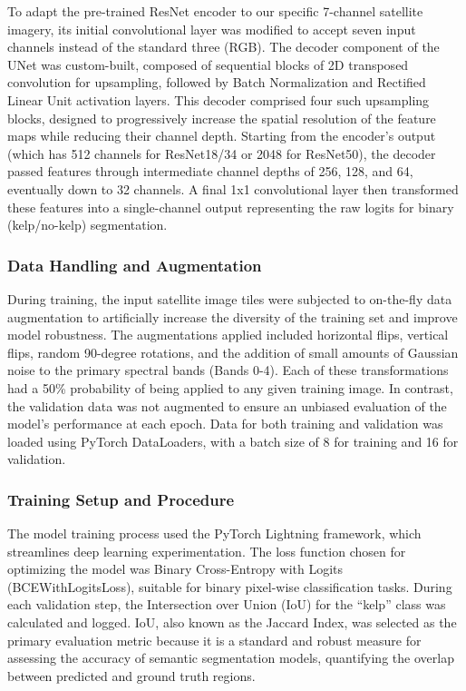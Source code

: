 \documentclass{article}
\begin{document}
To adapt the pre-trained ResNet encoder to our specific 7-channel satellite imagery, its initial convolutional layer was modified to accept seven input channels instead of the standard three (RGB). The decoder component of the UNet was custom-built, composed of sequential blocks of 2D transposed convolution for upsampling, followed by Batch Normalization and Rectified Linear Unit activation layers. This decoder comprised four such upsampling blocks, designed to progressively increase the spatial resolution of the feature maps while reducing their channel depth. Starting from the encoder's output (which has 512 channels for ResNet18/34 or 2048 for ResNet50), the decoder passed features through intermediate channel depths of 256, 128, and 64, eventually down to 32 channels. A final 1x1 convolutional layer then transformed these features into a single-channel output representing the raw logits for binary (kelp/no-kelp) segmentation.

\subsubsection{Data Handling and Augmentation}

During training, the input satellite image tiles were subjected to on-the-fly data augmentation to artificially increase the diversity of the training set and improve model robustness. The augmentations applied included horizontal flips, vertical flips, random 90-degree rotations, and the addition of small amounts of Gaussian noise to the primary spectral bands (Bands 0-4). Each of these transformations had a 50\% probability of being applied to any given training image. In contrast, the validation data was not augmented to ensure an unbiased evaluation of the model's performance at each epoch. Data for both training and validation was loaded using PyTorch DataLoaders, with a batch size of 8 for training and 16 for validation.

\subsubsection{Training Setup and Procedure}

The model training process used the PyTorch Lightning framework, which streamlines deep learning experimentation. The loss function chosen for optimizing the model was Binary Cross-Entropy with Logits (BCEWithLogitsLoss), suitable for binary pixel-wise classification tasks. During each validation step, the Intersection over Union (IoU) for the ``kelp'' class was calculated and logged. IoU, also known as the Jaccard Index, was selected as the primary evaluation metric because it is a standard and robust measure for assessing the accuracy of semantic segmentation models, quantifying the overlap between predicted and ground truth regions.
\end{document}
